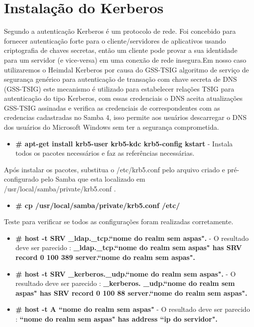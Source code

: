 \section{Instalação do Kerberos}

Segundo \cite{HEIMDAL} a autenticação Kerberos é um protocolo de rede. Foi concebido para fornecer autenticação forte para o cliente/servidores de aplicativos usando criptografia de chaves secretas, então um cliente pode provar a sua identidade para um servidor (e vice-versa) em uma conexão de rede insegura.Em nosso caso utilizaremos o Heimdal Kerberos por causa do GSS-TSIG algoritmo de serviço de segurança genérico para autenticação de transação com chave secreta de DNS (GSS-TSIG) este mecanismo é utilizado para estabelecer relações TSIG para autenticação do tipo Kerberos, com essas credenciais o DNS aceita atualizações GSS-TSIG assinadas e verifica as credenciais de correspondentes com as credencias cadastradas no Samba 4, isso permite aos usuários descarregar o DNS dos usuários do Microsoft Windows sem ter a segurança comprometida.

\begin{itemize}
	\item \textbf{\# apt-get install krb5-user krb5-kdc krb5-config kstart} - Instala todos os pacotes necessários e faz as referências necessárias.
\end{itemize}

Após instalar os pacotes, substitua o /etc/krb5.conf pelo arquivo criado e pré-configurado pelo Samba que esta localizado em /usr/local/samba/private/krb5.conf .

\begin{itemize}
	\item \textbf{\# cp /usr/local/samba/private/krb5.conf  /etc/}
\end{itemize}

Teste para verificar se todos as configurações foram realizadas corretamente.

\begin{itemize}
	\item \textbf{\# host -t SRV \_ldap.\_tcp.``nome do realm sem aspas".} - O resultado deve ser parecido : \textbf{\_ldap.\_tcp.``nome do realm sem aspas" has SRV record 0 100 389 server.``nome do realm sem aspas".}
	\item \textbf{\# host -t SRV \_kerberos.\_udp.``nome do realm sem aspas".} - O resultado deve ser parecido : \textbf{\_kerberos. \_udp.``nome do realm sem aspas" has SRV record 0 100 88 server.``nome do realm sem aspas".}
	\item \textbf{\# host -t A ``nome do realm sem aspas"} - O resultado deve ser parecido : \textbf{``nome do realm sem aspas" has address ``ip do servidor".} 
\end{itemize}

